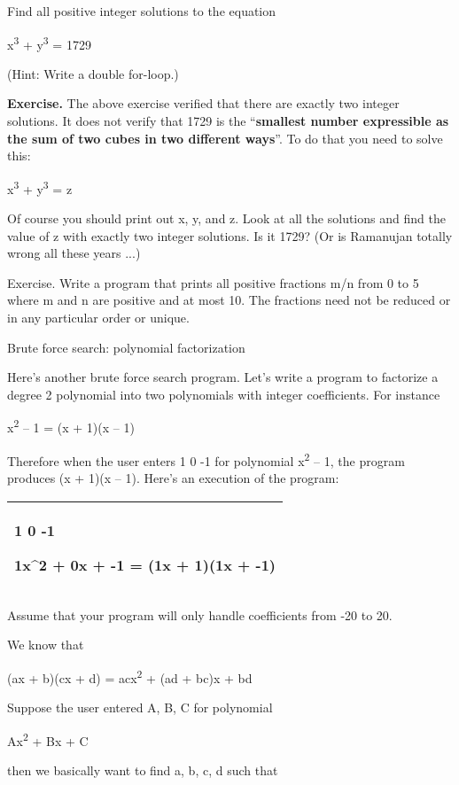 \documentclass[
]{article}
\begin{document}
Find all positive integer solutions to the equation

x\textsuperscript{3} + y\textsuperscript{3} = 1729

(Hint: Write a double for-loop.)

\textbf{Exercise.} The above exercise verified that there are exactly
two integer solutions. It does not verify that 1729 is the
``\textbf{smallest number expressible as the sum of two cubes in two
different ways}''. To do that you need to solve this:

x\textsuperscript{3} + y\textsuperscript{3} = z

Of course you should print out x, y, and z. Look at all the solutions
and find the value of z with exactly two integer solutions. Is it 1729?
(Or is Ramanujan totally wrong all these years ...)

Exercise. Write a program that prints all positive fractions m/n from 0
to 5 where m and n are positive and at most 10. The fractions need not
be reduced or in any particular order or unique.

Brute force search: polynomial factorization

Here's another brute force search program. Let's write a program to
factorize a degree 2 polynomial into two polynomials with integer
coefficients. For instance

x\textsuperscript{2} -- 1 = (x + 1)(x -- 1)

Therefore when the user enters 1 0 -1 for polynomial
x\textsuperscript{2} -- 1, the program produces (x + 1)(x -- 1). Here's
an execution of the program:

\begin{longtable}[]{@{}l@{}}
\toprule
\endhead
\begin{minipage}[t]{0.97\columnwidth}\raggedright
1 0 -1

1x\^{}2 + 0x + -1 = (1x + 1)(1x + -1)\strut
\end{minipage}\tabularnewline
\bottomrule
\end{longtable}

Assume that your program will only handle coefficients from -20 to 20.

We know that

(ax + b)(cx + d) = acx\textsuperscript{2} + (ad + bc)x + bd

Suppose the user entered A, B, C for polynomial

Ax\textsuperscript{2} + Bx + C

then we basically want to find a, b, c, d such that
\end{document}
